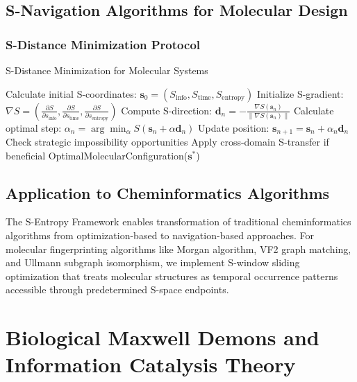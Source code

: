 ﻿\documentclass[11pt,a4paper]{article}
\begin{document}
\subsection{S-Navigation Algorithms for Molecular Design}

\subsubsection{S-Distance Minimization Protocol}

\begin{algorithm}
\caption{S-Distance Minimization for Molecular Systems}
\begin{algorithmic}
    \State Calculate initial S-coordinates: $\mathbf{s}_0 = (S_{\text{info}}, S_{\text{time}}, S_{\text{entropy}})$
    \State Initialize S-gradient: $\nabla S = \left(\frac{\partial S}{\partial s_{\text{info}}}, \frac{\partial S}{\partial s_{\text{time}}}, \frac{\partial S}{\partial s_{\text{entropy}}}\right)$
        \State Compute S-direction: $\mathbf{d}_n = -\frac{\nabla S(\mathbf{s}_n)}{\|\nabla S(\mathbf{s}_n)\|}$
        \State Calculate optimal step: $\alpha_n = \arg\min_{\alpha} S(\mathbf{s}_n + \alpha \mathbf{d}_n)$
        \State Update position: $\mathbf{s}_{n+1} = \mathbf{s}_n + \alpha_n \mathbf{d}_n$
        \State Check strategic impossibility opportunities
        \State Apply cross-domain S-transfer if beneficial
    \EndWhile
    \State \Return OptimalMolecularConfiguration($\mathbf{s}^*$)
\EndProcedure
\end{algorithmic}
\end{algorithm}

\subsection{Application to Cheminformatics Algorithms}

The S-Entropy Framework enables transformation of traditional cheminformatics algorithms from optimization-based to navigation-based approaches. For molecular fingerprinting algorithms like Morgan algorithm, VF2 graph matching, and Ullmann subgraph isomorphism, we implement S-window sliding optimization that treats molecular structures as temporal occurrence patterns accessible through predetermined S-space endpoints.

\section{Biological Maxwell Demons and Information Catalysis Theory}
\end{document}
